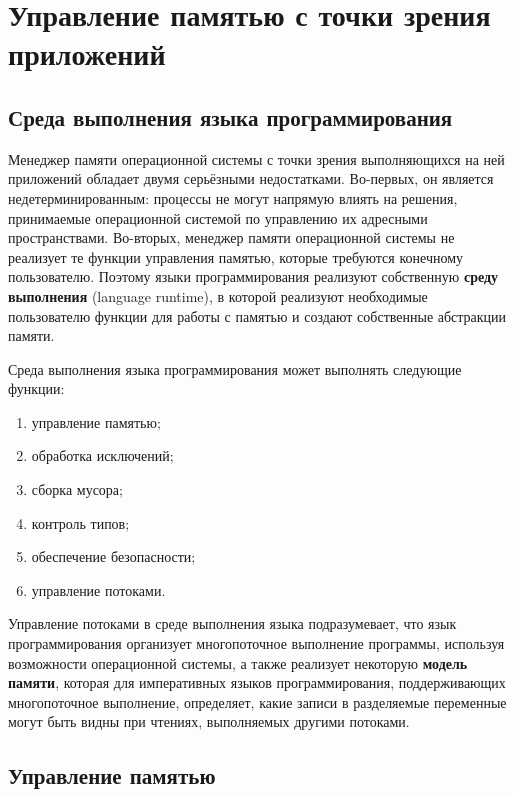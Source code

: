 \section*{Управление памятью с точки зрения приложений}

\subsection*{Среда выполнения языка программирования}

Менеджер памяти операционной системы с точки зрения выполняющихся на ней приложений обладает двумя серьёзными недостатками. Во-первых, он является недетерминированным: процессы не могут напрямую влиять на решения, принимаемые операционной системой по управлению их адресными пространствами. Во-вторых, менеджер памяти операционной системы не реализует те функции управления памятью, которые требуются конечному пользователю. Поэтому языки программирования реализуют собственную \textbf{среду выполнения} (language runtime), в которой реализуют необходимые пользователю функции для работы с памятью и создают собственные абстракции памяти.

Среда выполнения языка программирования может выполнять следующие функции:~\cite{dotnet_clr}

\begin{enumerate}[label*=\arabic*)]
	\item управление памятью;
	\item обработка исключений; 
	\item сборка мусора; 
	\item контроль типов;
	\item обеспечение безопасности; 
	\item управление потоками. 
\end{enumerate}

Управление потоками в среде выполнения языка подразумевает, что язык программирования организует многопоточное выполнение программы, используя возможности операционной системы, а также реализует некоторую \textbf{модель памяти}, которая для императивных языков программирования, поддерживающих многопоточное выполнение, определяет, какие записи в разделяемые переменные могут быть видны при чтениях, выполняемых другими потоками.~\cite{memory_model}

\subsection*{Управление памятью}
\label{reference_locality}

